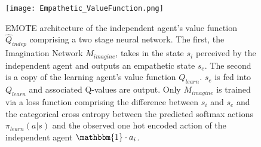 

\begin{figure}[ht]
  \centering
  \texttt{[image: Empathetic\_ValueFunction.png]}
  \caption{EMOTE architecture of the independent agent's value function $\hat{Q}_{indep}$ comprising a two stage neural network. The first, the Imagination Network $M_{imagine}$, takes in the state $s_{i}$ perceived by the independent agent and outputs an empathetic state $s_{e}$. The second is a copy of the learning agent's value function $Q_{learn}$. $s_{e}$ is fed into $Q_{learn}$ and associated Q-values are output. Only $M_{imagine}$ is trained via a loss function comprising the difference between $s_{i}$ and $s_{e}$ and the categorical cross entropy between the predicted softmax actions $\pi_{learn}(a|s)$ and the observed one hot encoded action of the independent agent $\mathbbm{1} \cdot a_{i}$.}  
  \label{fig:empathetic_valuefunction}
\vskip -0.2in
\end{figure}